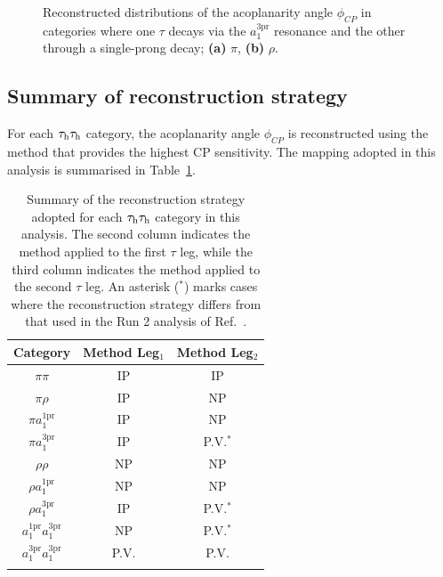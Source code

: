 \begin{figure}[!htbp]
\begin{subfigure}[b]{0.49\textwidth}
            \caption{}
        \end{subfigure}
    \caption[Reconstructed $\phi_{CP}$ distributions with the combined IP/NP--PV method.]
    {Reconstructed distributions of the acoplanarity angle $\phi_{CP}$ in categories where one $\tau$ decays via the $a_1^{3\mathrm{pr}}$ resonance and the other through a single-prong decay; \textbf{(a)} $\pi$, \textbf{(b)} $\rho$.}
    \label{Figure:CPDist_Combined_IPNP_PV}
\end{figure}

\subsection{Summary of reconstruction strategy}
\label{Section:Chapter7_MethodSummary}

For each $\tauh\tauh$ category, the acoplanarity angle $\phi_{CP}$ is reconstructed using the method that provides the highest CP sensitivity. The mapping adopted in this analysis is summarised in Table~\ref{Table:Chapter7_ReconstructionMethodSummary}.


\begin{table}[!htbp]
\centering
\renewcommand{\arraystretch}{1.5} %
\setlength{\tabcolsep}{10pt} %
\begin{tabular}{ccc}
\hline
Category & Method Leg$_1$ & Method Leg$_2$\\
\hline
$\pi\pi$       & \ac{IP} & \ac{IP} \\
\arrayrulecolor{lightgray} \hline
$\pi\rho$       & \ac{IP} & \ac{NP} \\
\arrayrulecolor{lightgray} \hline
$\pi a_1^\text{1pr}$       & \ac{IP} & \ac{NP} \\
\arrayrulecolor{lightgray} \hline
$\pi a_1^\text{3pr}$       & \ac{IP} & \ac{P.V.}$^*$ \\
\arrayrulecolor{lightgray} \hline
$\rho\rho$       & \ac{NP} & \ac{NP} \\
\arrayrulecolor{lightgray} \hline
$\rho a_1^\text{1pr}$       & \ac{NP} & \ac{NP} \\
\arrayrulecolor{lightgray} \hline
$\rho a_1^\text{3pr}$       & \ac{IP} & \ac{P.V.}$^*$ \\
\arrayrulecolor{lightgray} \hline
$a_1^\text{1pr} a_1^\text{3pr}$       & \ac{NP} & \ac{P.V.}$^*$ \\
\arrayrulecolor{lightgray} \hline
$a_1^\text{3pr} a_1^\text{3pr}$       & \ac{P.V.} & \ac{P.V.} \\
\arrayrulecolor{black} \hline
\end{tabular}
\caption[Summary of reconstruction methods per $\tauh\tauh$ category.]
{Summary of the reconstruction strategy adopted for each $\tauh\tauh$ category in this analysis. The second column indicates the method applied to the first $\tau$ leg, while the third column indicates the method applied to the second $\tau$ leg. An asterisk ($^*$) marks cases where the reconstruction strategy differs from that used in the Run 2 analysis of Ref.~\cite{HiggsCP_CMS_2021}.}
\label{Table:Chapter7_ReconstructionMethodSummary}
\end{table}

